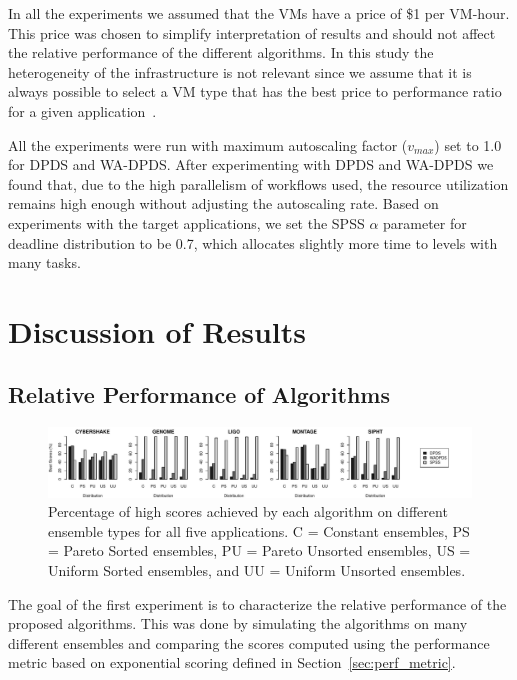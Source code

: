 \documentclass[preprint,5p]{elsarticle}
\begin{document}
In all the experiments we assumed that the VMs have a price of \$1 per VM-hour.
This price was chosen to simplify interpretation of results and should not
affect the relative performance of the different algorithms. In this study the
heterogeneity of the infrastructure is not relevant since we assume that it is
always possible to select a VM type that has the best price to performance ratio
for a given application~\cite{Juve2009}.

All the experiments were run with maximum autoscaling factor ($v_{max}$) set to
1.0 for DPDS and WA-DPDS. After experimenting with DPDS and WA-DPDS we found
that, due to the high parallelism of workflows used, the resource utilization
remains high enough without adjusting the autoscaling rate. Based on experiments
with the target applications, we set the SPSS $\alpha$ parameter for deadline
distribution to be 0.7, which allocates slightly more time to levels with many
tasks.




\section{Discussion of Results}
\label{sec:results}


\subsection{Relative Performance of Algorithms}
\label{sec:relative-performance}


\begin{figure}[tb]
    \centering
    \includegraphics[width=\textwidth]{run-finish-variations-test-0-output-distributions}
    \caption{Percentage of high scores achieved by each algorithm on different ensemble types for all five applications. C = Constant ensembles, PS = Pareto Sorted ensembles, PU = Pareto Unsorted ensembles, US = Uniform Sorted ensembles, and UU = Uniform Unsorted ensembles.} 
    \label{fig:distributions}
\end{figure}




The goal of the first experiment is to characterize the relative performance
of the proposed algorithms. This was done by simulating the algorithms on many
different ensembles and comparing the scores computed using the
performance metric based on exponential scoring defined in
Section~\ref{sec:perf_metric}.
\end{document}
